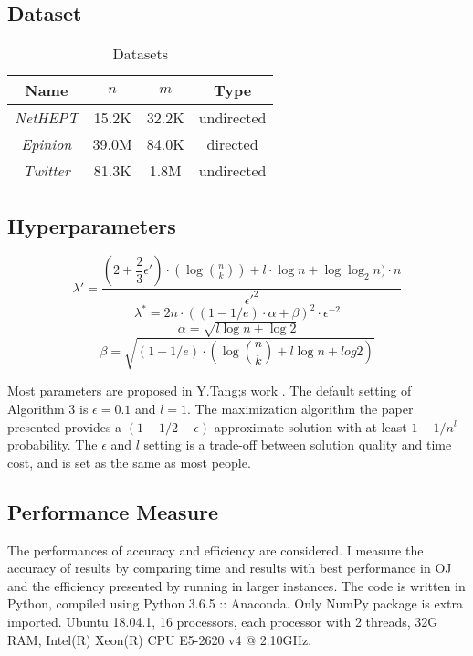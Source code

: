 \documentclass[conference,compsoc]{IEEEtran}
\begin{document}
\subsection{Dataset}
\begin{table}[H]
	\caption{Datasets}
	\centering\begin{tabular}{|c|c|c|c|} 
		\hline		
		\textbf{Name} & $n$ & $m$ & \textbf{Type} \\
		\hline
		\textit{NetHEPT} & 15.2K & 32.2K & undirected \\
		\hline
		\textit{Epinion} & 39.0M & 84.0K & directed \\
		\hline
		\textit{Twitter} & 81.3K & 1.8M & undirected  \\
		\hline
	\end{tabular}
\end{table}


\subsection{Hyperparameters}
\par 
\begin{equation}
\lambda\prime = \dfrac{(2 + \dfrac{2}{3}\epsilon\prime) \cdot (\log\binom{n}{k}) + l \cdot \log n + \log \log_2 n) \cdot n}{\epsilon\prime^2}
\end{equation}
\begin{equation}
\lambda^\ast = 2n \cdot ((1-1/e)\cdot\alpha+\beta)^2\cdot\epsilon^{-2}
\end{equation}
\begin{equation}
\alpha = \sqrt{l\log n + \log 2}
\end{equation}
\begin{equation}
\beta = \sqrt{(1 - 1/e) \cdot (\log\binom{n}{k} + l\log n + log 2)}
\end{equation}

Most parameters are proposed in Y.Tang;s work \cite{IMM}. The default setting of Algorithm 3 is $\epsilon = 0.1$ and $l = 1$. The maximization algorithm the paper presented provides a $(1-1/2-\epsilon)$-approximate solution with at least $1-1/n^l$ probability.  The $\epsilon$ and $l$ setting is a trade-off between solution quality and time cost, and is set as the same as most people.

\subsection{Performance Measure}
\par The performances of accuracy and efficiency are considered. I measure the accuracy of results by comparing time and results with best performance in OJ and the efficiency presented by running in larger instances.
The code is written in Python, compiled using Python 3.6.5 :: Anaconda. Only NumPy package is extra imported. Ubuntu 18.04.1,   
16 processors, each processor with 2 threads, 32G RAM,  Intel(R) Xeon(R) CPU E5-2620 v4 @ 2.10GHz.
\end{document}

